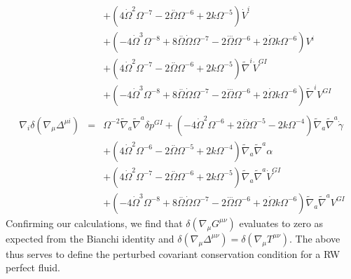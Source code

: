 \begin{eqnarray}
\nonumber\\
&&+(4 \dot{\Omega}^2 \Omega^{-7} - 2 \overset{..}{\Omega} \Omega^{-6} + 2 k \Omega^{-5}) \dot{V}^{i} \nonumber \\ 
&& + (-4 \dot{\Omega}^3 \Omega^{-8} + 8 \overset{..}{\Omega} \dot{\Omega} \Omega^{-7} - 2 \overset{...}{\Omega} \Omega^{-6} + 2 \dot{\Omega} k \Omega^{-6}) V^{i} 
\nonumber\\
&&+ (4 \dot{\Omega}^2 \Omega^{-7} - 2 \overset{..}{\Omega} \Omega^{-6} + 2 k \Omega^{-5}) \tilde{\nabla}^{i}\dot{V}^{GI}{} \nonumber \\ 
&& + (-4 \dot{\Omega}^3 \Omega^{-8} + 8 \overset{..}{\Omega} \dot{\Omega} \Omega^{-7} - 2 \overset{...}{\Omega} \Omega^{-6} + 2 \dot{\Omega} k \Omega^{-6}) \tilde{\nabla}^{i}V^{GI}{}
\\  \nonumber\\ 
\nabla_i \delta(\nabla_\mu \Delta^{\mu i})&=& \Omega^{-2} \tilde{\nabla}_{a}\tilde{\nabla}^{a}\delta p^{GI}{} + (-4 \dot{\Omega}^2 \Omega^{-6} + 2 \overset{..}{\Omega} \Omega^{-5} - 2 k \Omega^{-4}) \tilde{\nabla}_{a}\tilde{\nabla}^{a}\dot{\gamma} \nonumber \\ 
&& + (4 \dot{\Omega}^2 \Omega^{-6} - 2 \overset{..}{\Omega} \Omega^{-5} + 2 k \Omega^{-4}) \tilde{\nabla}_{a}\tilde{\nabla}^{a}\alpha 
\nonumber\\
&&+(4 \dot{\Omega}^2 \Omega^{-7} - 2 \overset{..}{\Omega} \Omega^{-6} + 2 k \Omega^{-5}) \tilde{\nabla}_{a}\tilde{\nabla}^{a}\dot{V}^{GI}{} \nonumber \\ 
&& + (-4 \dot{\Omega}^3 \Omega^{-8} + 8 \overset{..}{\Omega} \dot{\Omega} \Omega^{-7} - 2 \overset{...}{\Omega} \Omega^{-6} + 2 \dot{\Omega} k \Omega^{-6}) \tilde{\nabla}_{a}\tilde{\nabla}^{a}V^{GI}{}
\end{eqnarray}
Confirming our calculations, we find that $\delta(\nabla_\mu G^{\mu \nu})$ evaluates to zero as expected from the Bianchi identity and $\delta(\nabla_\mu \Delta^{\mu \nu})=\delta(\nabla_\mu T^{\mu \nu})$. The above thus serves to define the perturbed covariant conservation condition for a RW perfect fluid.
%
%
%
